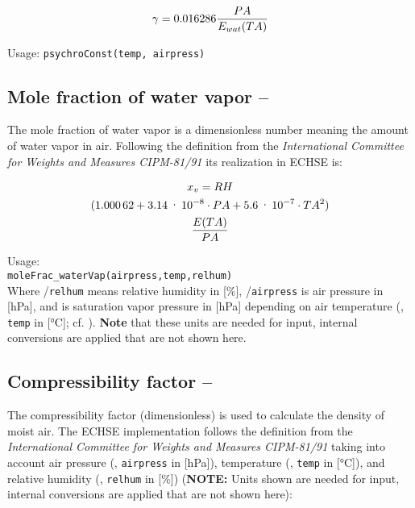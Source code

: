 \begin{equation} \label{eqn:meteo:psychro}
\gamma{} = 0.016286 \frac{PA{}}{E_{wat}{(TA{})}}
\end{equation}

\noindent
Usage:
\verb!psychroConst(temp, airpress)!\\


\subsection{Mole fraction of water vapor -- \moleFracWaterVap} \label{sec:meteo:molefracvap}
The mole fraction of water vapor is a dimensionless number meaning the amount of water vapor in air. Following the definition from the \emph{International Committee for Weights and Measures CIPM-81/91} its realization in ECHSE is:

\begin{multline}\label{eqn:meteo:molefracvap}
x_{v}{} = RH{} \\ 
(\num{1.00062} + \num{3.14e-08} \cdot PA{} + \num{5.6e-07} \cdot TA{}^2) \\
\frac{E{(TA{})}}{PA{}}
\end{multline}

\noindent
Usage:\\
\verb!moleFrac_waterVap(airpress,temp,relhum)!\\

Where \relHumidity{}/\verb!relhum! means relative humidity in [\si{\percent}], \airPressure{}/\verb!airpress! is air pressure in [\si{\hecto\pascal}], and \satVaporPressure{} is saturation vapor pressure in [\si{\hecto\pascal}] depending on air temperature (\airtemp{}, \verb!temp! in [\si{\degreeCelsius}]; cf. ). \textbf{Note} that these units are needed for input, internal conversions are applied that are not shown here.


\subsection{Compressibility factor -- \compressibilityFactor} \label{sec:meteo:compressfac}
The compressibility factor (dimensionless) is used to calculate the density of moist air. The ECHSE implementation follows the definition from the \emph{International Committee for Weights and Measures CIPM-81/91} taking into account air pressure (\airPressure{}, \verb!airpress! in [\si{\hecto\pascal}]), temperature (\airtemp{}, \verb!temp! in [\si{\degreeCelsius}]), and relative humidity (\relHumidity{}, \verb!relhum! in [\si{\percent}]) (\textbf{NOTE:} Units shown are needed for input, internal conversions are applied that are not shown here):

